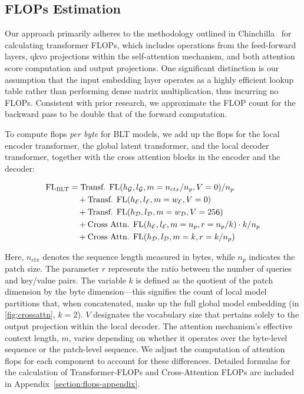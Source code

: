 \subsection{FLOPs Estimation} 
\label{section:flops}

Our approach primarily adheres to the methodology outlined in Chinchilla~\citep{hoffmann2022training} for calculating transformer FLOPs, which includes operations from the feed-forward layers, qkvo projections within the self-attention mechanism, and both attention score computation and output projections. One significant distinction is our assumption that the input embedding layer operates as a highly efficient lookup table rather than performing dense matrix multiplication, thus incurring no FLOPs. Consistent with prior research, we approximate the FLOP count for the backward pass to be double that of the forward computation.

To compute flops \textit{per byte} for {\textsc BLT} models, we add up the flops for the local encoder transformer, the global latent transformer, and the local decoder transformer, together with the cross attention blocks in the encoder and the decoder:

\begin{align}
    \text{FL}_{\text{{\textsc BLT}}} &= \text{Transf. FL}(h_{\mathcal{G}}, l_{\mathcal{G}}, m=n_{ctx}/n_p, V=0) / n_p\\
    &\quad + \text{Transf. FL}(h_{\mathcal{E}}, l_{\mathcal{E}}, m=w_{\mathcal{E}}, V=0) \\
    &\quad + \text{Transf. FL}(h_{\mathcal{D}}, l_{\mathcal{D}}, m=w_{\mathcal{D}}, V=256) \\
    &\quad + \text{Cross Attn. FL}(h_{\mathcal{E}}, l_{\mathcal{E}}, m=n_p, r=n_p/k) \cdot k/n_p \\
    &\quad + \text{Cross Attn. FL}(h_{\mathcal{D}}, l_{\mathcal{D}}, m=k, r=k/n_p)
\end{align}

Here, $n_{ctx}$ denotes the sequence length measured in bytes, while $n_p$ indicates the patch size. The parameter $r$ represents the ratio between the number of queries and key/value pairs. The variable $k$ is defined as the quotient of the patch dimension by the byte dimension—this signifies the count of local model partitions that, when concatenated, make up the full global model embedding (in \autoref{fig:crossattn}, $k=2$). $V$ designates the vocabulary size that pertains solely to the output projection within the local decoder. The attention mechanism's effective context length, $m$, varies depending on whether it operates over the byte-level sequence or the patch-level sequence. We adjust the computation of attention flops for each component to account for these differences. Detailed formulas for the calculation of Transformer-FLOPs and Cross-Attention FLOPs are included in Appendix~\ref{section:flops-appendix}.

